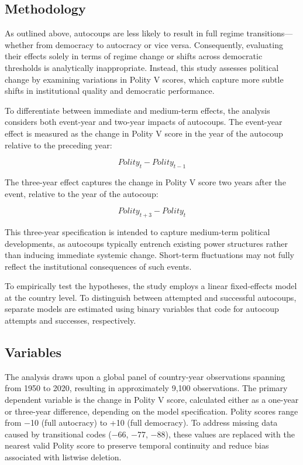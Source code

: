 \documentclass[
  12pt,
]{report}
\begin{document}
\subsection*{Methodology}\label{methodology-1}

As outlined above, autocoups are less likely to result in full regime
transitions---whether from democracy to autocracy or vice versa.
Consequently, evaluating their effects solely in terms of regime change
or shifts across democratic thresholds is analytically inappropriate.
Instead, this study assesses political change by examining variations in
Polity V scores, which capture more subtle shifts in institutional
quality and democratic performance.

To differentiate between immediate and medium-term effects, the analysis
considers both event-year and two-year impacts of autocoups. The
event-year effect is measured as the change in Polity V score in the
year of the autocoup relative to the preceding year:

\[
Polity_{t} - Polity_{t-1}
\]

The three-year effect captures the change in Polity V score two years
after the event, relative to the year of the autocoup:

\[
Polity_{t+3} - Polity_t
\]

This three-year specification is intended to capture medium-term
political developments, as autocoups typically entrench existing power
structures rather than inducing immediate systemic change. Short-term
fluctuations may not fully reflect the institutional consequences of
such events.

To empirically test the hypotheses, the study employs a linear
fixed-effects model at the country level. To distinguish between
attempted and successful autocoups, separate models are estimated using
binary variables that code for autocoup attempts and successes,
respectively.

\subsection*{Variables}\label{variables}

The analysis draws upon a global panel of country-year observations
spanning from 1950 to 2020, resulting in approximately 9,100
observations. The primary dependent variable is the change in Polity V
score, calculated either as a one-year or three-year difference,
depending on the model specification. Polity scores range from −10 (full
autocracy) to +10 (full democracy). To address missing data caused by
transitional codes (−66, −77, −88), these values are replaced with the
nearest valid Polity score to preserve temporal continuity and reduce
bias associated with listwise deletion.
\end{document}
